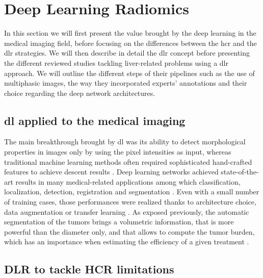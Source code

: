 \section{Deep Learning Radiomics}\label{deep-learning-radiomics}

In this section we will first present the value brought by the deep learning in the medical imaging field, before focusing on the differences between the
\ac{hcr} and the \ac{dlr} strategies. We will then describe in detail
the \ac{dlr} concept before presenting the different reviewed
studies tackling liver-related problems using a \ac{dlr} approach. We
will outline the different steps of their pipelines such as the use of
multiphasic images, the way they incorporated experts' annotations and
their choice regarding the deep network architectures.

\subsection{\ac{dl} applied to the medical imaging}

The main breakthrough brought by \ac{dl} was its ability to detect
morphological properties in images only by using the pixel intensities
as input, whereas traditional machine learning methods often required
sophisticated hand-crafted features to achieve descent results \cite{Litjens2017, Suzuki2017}. Deep learning networks achieved
state-of-the-art results in many medical-related applications among
which classification, localization, detection, registration and
segmentation \cite{Ker2017}. Even with a small number of
training cases, those performances were realized thanks to architecture
choice, data augmentation or transfer learning \cite{Zheng2018, Hu2018}.
As exposed previously, the automatic segmentation of the tumors brings a
volumetric information, that is more powerful than the diameter only,
and that allows to compute the tumor burden, which has an importance
when estimating the efficiency of a given treatment \cite{Gobbi2004, Bornemann2007, Heussel2007, Kuhnigk2006, Puesken2010, Bauknecht2010}.\\

\subsection{DLR to tackle HCR limitations}\label{difference-between-hcr-and-dlr}

